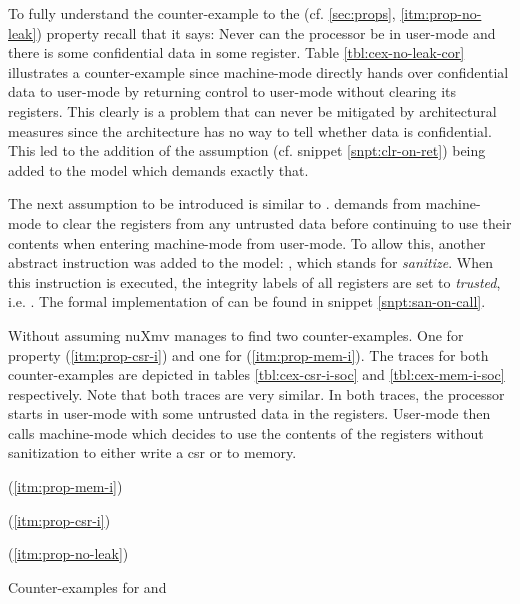 To fully understand the counter-example to the  (cf. \ref{sec:props}, \ref{itm:prop-no-leak}) property recall that it says: Never can the processor be in user-mode and there is some confidential data in some register.
Table \ref{tbl:cex-no-leak-cor} illustrates a counter-example since machine-mode directly hands over confidential data to user-mode by returning control to user-mode without clearing its registers.
This clearly is a problem that can never be mitigated by architectural measures since the architecture has no way to tell whether data is confidential.
This led to the addition of the assumption  (cf. snippet \ref{snpt:clr-on-ret}) being added to the model which demands exactly that.

The next assumption to be introduced is similar to .
 demands from machine-mode to clear the registers from any untrusted data before continuing to use their contents when entering machine-mode from user-mode.
To allow this, another abstract instruction was added to the model: , which stands for \textit{sanitize}.
When this instruction is executed, the integrity labels of all registers are set to \textit{trusted}, i.e. .
The formal implementation of  can be found in snippet \ref{snpt:san-on-call}.

Without assuming  nuXmv manages to find two counter-examples.
One for property  (\ref{itm:prop-csr-i}) and one for  (\ref{itm:prop-mem-i}).
The traces for both counter-examples are depicted in tables \ref{tbl:cex-csr-i-soc} and \ref{tbl:cex-mem-i-soc} respectively.
Note that both traces are very similar.
In both traces, the processor starts in user-mode with some untrusted data in the registers.
User-mode then calls machine-mode which decides to use the contents of the registers without sanitization to either write a \gls{csr} or to memory.

\begin{table}
    \begin{subtable}{\textwidth}
        \centering
        
        \caption{ (\ref{itm:prop-mem-i})}
        \label{tbl:cex-mem-i-soc}
    \end{subtable}

    \begin{subtable}{\textwidth}
        \centering
        
        \caption{ (\ref{itm:prop-csr-i})}
        \label{tbl:cex-csr-i-soc}
    \end{subtable}

    \begin{subtable}{\textwidth}
        \centering
        
        \caption{ (\ref{itm:prop-no-leak})}
        \label{tbl:cex-no-leak-cor}
    \end{subtable}
    \caption{Counter-examples for  and }
\end{table}

